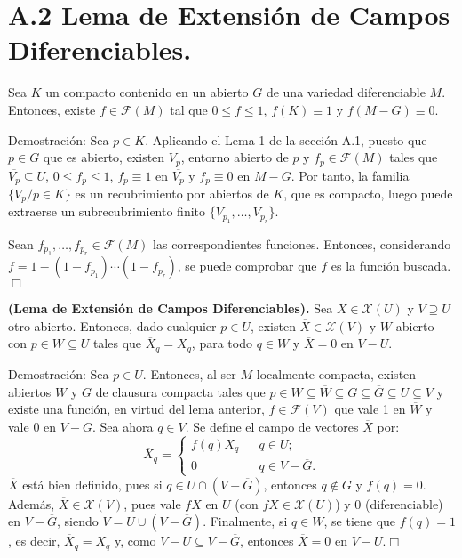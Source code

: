 \documentclass[cursovd_portada.tex]{subfiles}
\begin{document}
\section*{A.2 Lema de Extensión de Campos Diferenciables.}
\begin{lemaap}
Sea $K$ un compacto contenido en un abierto $G$ de una variedad diferenciable $M$. Entonces, existe
$f\in\mathcal{F}(M)$ tal que $0\leq f\leq 1$, $f(K)\equiv 1$ y $f(M-G)\equiv 0$.
\end{lemaap}
{\sc Demostración:} Sea $p\in K$. Aplicando el Lema 1 de la sección A.1, puesto que $p\in G$ que es abierto,
existen $V_p$, entorno abierto de $p$ y $f_p\in\mathcal{F}(M)$ tales que $\overline{V_p}\subseteq U$, $0\leq
f_p\leq 1$, $f_p\equiv 1$ en $\overline{V_p}$ y $f_p\equiv 0$ en $M-G$. Por tanto, la familia $\{V_p/p\in K\}$ es
un recubrimiento por abiertos de $K$, que es compacto, luego puede extraerse un subrecubrimiento finito
$\{V_{p_1},\dots ,V_{p_r}\}$.
\par
Sean $f_{p_1},\dots ,f_{p_r}\in\mathcal{F}(M)$ las correspondientes funciones. Entonces, considerando
$f=1-(1-f_{p_1})\cdots(1-f_{p_r})$, se puede comprobar que $f$ es la función buscada.\hfill $\Box$
\begin{teoap}
{\bf (Lema de Extensión de Campos Diferenciables).} Sea $X\in\mathcal{X}(U)$ y $V\supseteq U$ otro abierto.
Entonces, dado cualquier $p\in U$, existen $\overline{X}\in\mathcal{X}(V)$ y $W$ abierto con $p\in W\subseteq U$
tales que $\overline{X}_q=X_q$, para todo $q\in W$ y $\overline{X}=0$ en $V-U$.
\end{teoap}
{\sc Demostración:} Sea $p\in U$. Entonces, al ser $M$ localmente compacta, existen abiertos $W$ y $G$ de clausura
compacta tales que $p\in W\subseteq\overline{W}\subseteq G\subseteq\overline{G}\subseteq U\subseteq V$ y existe
una función, en virtud del lema anterior, $f\in\mathcal{F}(V)$ que vale 1 en $\overline{W}$ y vale 0 en $V-G$. Sea
ahora $q\in V$. Se define el campo de vectores $\overline{X}$ por:
$$\overline{X}_q=\left\{
\begin{array}{ccl}
f(q)X_q & & q\in U;\\
0 & & q\in V-\overline{G}.
\end{array}
\right.$$ \hs $\overline{X}$ está bien definido, pues si $q\in U\cap(V-\overline{G})$, entonces $q\notin G$ y
$f(q)=0$. Además, $\overline{X}\in\mathcal{X}(V)$, pues vale $fX$ en $U$ (con $fX\in\mathcal{X}(U)$) y 0
(diferenciable) en $V-\overline{G}$, siendo $V=U\cup(V-\overline{G})$. Finalmente, si $q\in W$, se tiene que
$f(q)=1$, es decir, $\overline{X}_q=X_q$ y, como $V-U\subseteq V-\overline{G}$, entonces $\overline{X}=0$ en
$V-U$.\hfill $\Box$
\end{document}
